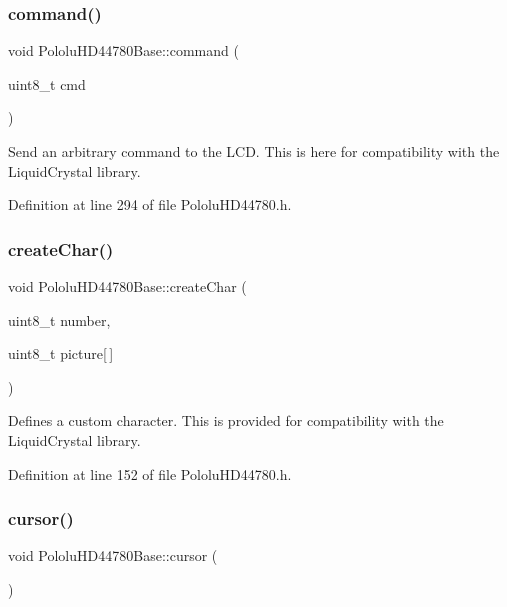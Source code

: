 \subsubsection{\texorpdfstring{command()}{command()}}
{\footnotesize\ttfamily void Pololu\+H\+D44780\+Base\+::command (\begin{DoxyParamCaption}\item[{uint8\+\_\+t}]{cmd }\end{DoxyParamCaption})\hspace{0.3cm}{\ttfamily [inline]}}

Send an arbitrary command to the L\+CD. This is here for compatibility with the Liquid\+Crystal library. 

Definition at line 294 of file Pololu\+H\+D44780.\+h.

\mbox{\label{class_pololu_h_d44780_base_afd802cdc57783830acfe2415355d9f09}} 
\subsubsection{\texorpdfstring{create\+Char()}{createChar()}}
{\footnotesize\ttfamily void Pololu\+H\+D44780\+Base\+::create\+Char (\begin{DoxyParamCaption}\item[{uint8\+\_\+t}]{number,  }\item[{uint8\+\_\+t}]{picture\mbox{[}$\,$\mbox{]} }\end{DoxyParamCaption})\hspace{0.3cm}{\ttfamily [inline]}}

Defines a custom character. This is provided for compatibility with the Liquid\+Crystal library. 

Definition at line 152 of file Pololu\+H\+D44780.\+h.

\mbox{\label{class_pololu_h_d44780_base_a4fd53028d74561be579103d674aa8eab}} 
\subsubsection{\texorpdfstring{cursor()}{cursor()}}
{\footnotesize\ttfamily void Pololu\+H\+D44780\+Base\+::cursor (\begin{DoxyParamCaption}{ }\end{DoxyParamCaption})}

